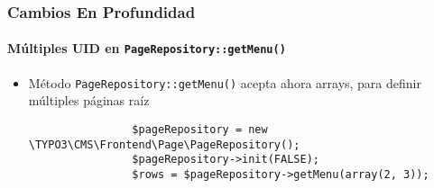 
\begin{frame}[fragile]
	\frametitle{Cambios En Profundidad}
	\framesubtitle{Múltiples UID en \texttt{PageRepository::getMenu()}}

	\begin{itemize}


		\item Método \texttt{PageRepository::getMenu()} acepta ahora arrays, para definir múltiples páginas raíz

			\begin{lstlisting}
				$pageRepository = new \TYPO3\CMS\Frontend\Page\PageRepository();
				$pageRepository->init(FALSE);
				$rows = $pageRepository->getMenu(array(2, 3));
			\end{lstlisting}

	\end{itemize}

\end{frame}

